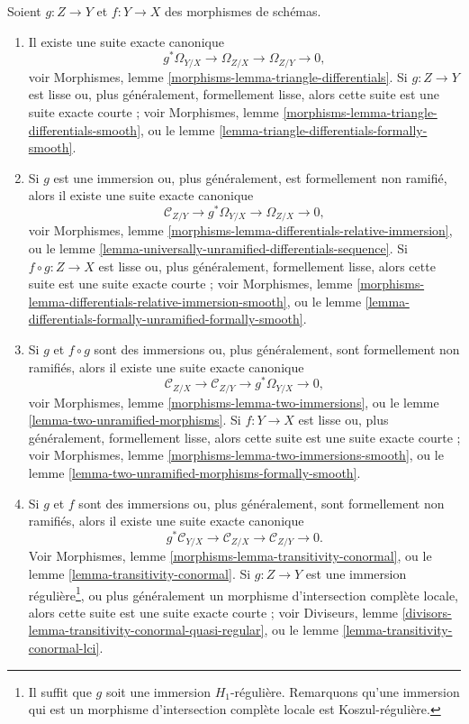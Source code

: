\medskip\noindent
Soient $g : Z \to Y$ et $f : Y \to X$ des morphismes de schémas.
\begin{enumerate}
\item Il existe une suite exacte canonique
$$
g^*\Omega_{Y/X} \to \Omega_{Z/X} \to \Omega_{Z/Y} \to 0,
$$
voir
Morphismes, lemme \ref{morphisms-lemma-triangle-differentials}.
Si $g : Z \to Y$ est lisse ou, plus généralement, formellement lisse, alors cette
suite est une suite exacte courte ; voir
Morphismes, lemme \ref{morphisms-lemma-triangle-differentials-smooth},
ou le lemme \ref{lemma-triangle-differentials-formally-smooth}.
\item Si $g$ est une immersion ou, plus généralement, est formellement non ramifié,
alors il existe une suite exacte canonique
$$
\mathcal{C}_{Z/Y} \to g^*\Omega_{Y/X} \to \Omega_{Z/X} \to 0,
$$
voir Morphismes, lemme \ref{morphisms-lemma-differentials-relative-immersion},
ou le lemme \ref{lemma-universally-unramified-differentials-sequence}.
Si $f \circ g : Z \to X$ est lisse ou, plus généralement, formellement lisse, alors cette
suite est une suite exacte courte ; voir
Morphismes, lemme \ref{morphisms-lemma-differentials-relative-immersion-smooth},
ou le lemme \ref{lemma-differentials-formally-unramified-formally-smooth}.
\item Si $g$ et $f \circ g$ sont des immersions ou, plus généralement,
sont formellement non ramifiés, alors il existe une suite exacte canonique
$$
\mathcal{C}_{Z/X} \to \mathcal{C}_{Z/Y} \to g^*\Omega_{Y/X} \to 0,
$$
voir
Morphismes, lemme \ref{morphisms-lemma-two-immersions}, ou le
lemme \ref{lemma-two-unramified-morphisms}. Si $f : Y \to X$ est lisse ou,
plus généralement, formellement lisse, alors cette suite est une suite exacte courte ;
voir Morphismes, lemme \ref{morphisms-lemma-two-immersions-smooth}, ou le
lemme \ref{lemma-two-unramified-morphisms-formally-smooth}.
\item Si $g$ et $f$ sont des immersions ou, plus généralement, sont formellement non ramifiés, alors
il existe une suite exacte canonique
$$
g^*\mathcal{C}_{Y/X} \to \mathcal{C}_{Z/X} \to \mathcal{C}_{Z/Y} \to 0.
$$
Voir
Morphismes, lemme \ref{morphisms-lemma-transitivity-conormal}, ou le
lemme \ref{lemma-transitivity-conormal}.
Si $g : Z \to Y$ est une immersion régulière\footnote{Il suffit que $g$ soit
une immersion $H_1$-régulière. Remarquons qu'une immersion qui est un
morphisme d'intersection complète locale est Koszul-régulière.}, ou
plus généralement un morphisme d'intersection complète locale, alors cette
suite est une suite exacte courte ; voir
Diviseurs, lemme \ref{divisors-lemma-transitivity-conormal-quasi-regular},
ou le lemme \ref{lemma-transitivity-conormal-lci}.
\end{enumerate}










